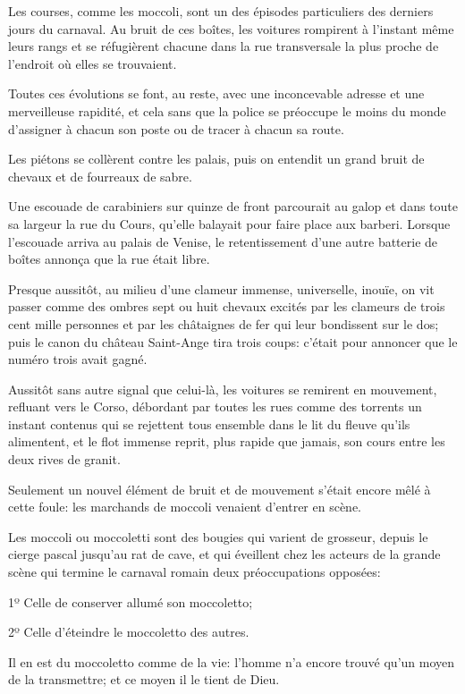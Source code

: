 Les courses, comme les moccoli, sont un des épisodes particuliers des derniers jours du carnaval. Au bruit de ces boîtes, les voitures rompirent à l'instant même leurs rangs et se réfugièrent chacune dans la rue transversale la plus proche de l'endroit où elles se trouvaient. 

Toutes ces évolutions se font, au reste, avec une inconcevable adresse et une merveilleuse rapidité, et cela sans que la police se préoccupe le moins du monde d'assigner à chacun son poste ou de tracer à chacun sa route. 

Les piétons se collèrent contre les palais, puis on entendit un grand bruit de chevaux et de fourreaux de sabre. 

Une escouade de carabiniers sur quinze de front parcourait au galop et dans toute sa largeur la rue du Cours, qu'elle balayait pour faire place aux barberi. Lorsque l'escouade arriva au palais de Venise, le retentissement d'une autre batterie de boîtes annonça que la rue était libre. 

Presque aussitôt, au milieu d'une clameur immense, universelle, inouïe, on vit passer comme des ombres sept ou huit chevaux excités par les clameurs de trois cent mille personnes et par les châtaignes de fer qui leur bondissent sur le dos; puis le canon du château Saint-Ange tira trois coups: c'était pour annoncer que le numéro trois avait gagné. 

Aussitôt sans autre signal que celui-là, les voitures se remirent en mouvement, refluant vers le Corso, débordant par toutes les rues comme des torrents un instant contenus qui se rejettent tous ensemble dans le lit du fleuve qu'ils alimentent, et le flot immense reprit, plus rapide que jamais, son cours entre les deux rives de granit. 

Seulement un nouvel élément de bruit et de mouvement s'était encore mêlé à cette foule: les marchands de moccoli venaient d'entrer en scène. 

Les moccoli ou moccoletti sont des bougies qui varient de grosseur, depuis le cierge pascal jusqu'au rat de cave, et qui éveillent chez les acteurs de la grande scène qui termine le carnaval romain deux préoccupations opposées: 

1º Celle de conserver allumé son moccoletto; 

2º Celle d'éteindre le moccoletto des autres. 

Il en est du moccoletto comme de la vie: l'homme n'a encore trouvé qu'un moyen de la transmettre; et ce moyen il le tient de Dieu. 

